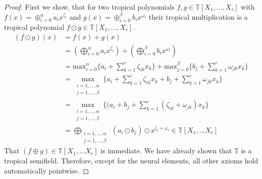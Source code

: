 \documentclass{article}
\theoremstyle{definition}
\begin{document}
\begin{proof}
First we show, that for two tropical polynomials $f, g \in \mathbb{T}[X_1, \dots , X_r]$ with $f(x) =\oplus_{i=0}^{\alpha} a_{i} x^{\zeta_{i}}$ and $g(x)= \oplus_{i=0}^{\beta} b_{i} x^{\omega_{i}}$ their tropical multiplication is a tropical polynomial $f \odot g \in \mathbb{T}[X_1, \dots , X_r]$.
\begin{align*} 
(f \odot g)(x) &= f(x) + g(x) \\
&=  (\bigoplus_{i=0}^{\alpha} a_{i} x^{\zeta_{i}}) + (\bigoplus_{i=0}^{\beta} b_{i} x^{\omega_{i}}) \\
&= \text{max}_{i=0}^{\alpha} \{ a_{i} + \sum_{k=1}^{r} \zeta_{ik} x_{k} \} + \text{max}_{j=0}^{\beta} \{ b_{j} + \sum_{k=1}^{r} \omega_{jk} x_{k} \} \\
&= \max_{\substack{
   i=1, \dots , \alpha \\
   j=1, \dots , \beta
  }} \{ a_{i} + \sum_{k=1}^{r} \zeta_{ik} x_{k} + b_{j} + \sum_{k=1}^{r} \omega_{jk} x_{k} \} \\
&= \max_{\substack{
   i=1, \dots , \alpha \\
   j=1, \dots , \beta
  }} \{ (a_{i} + b_{j} + \sum_{k=1}^{r} (\zeta_{ik} + \omega_{jk}) x_{k} \} \\
&= \bigoplus_{\substack{
   i=1, \dots , \alpha \\
   j=1, \dots , \beta
  }} \ (a_{i} \odot b_{j}) \odot x^{\zeta_{i} + \omega_{i}} \in \mathbb{T}[X_1, \dots X_r]
\end{align*}
That $(f \oplus g) \in \mathbb{T}[X_1, \dots X_r]$ is immediate. We have already shown that $\mathbb{T}$ is a tropical semifield. Therefore, except for the neural elements, all other axioms hold automatically pointwise.


\end{proof}
\end{document}
